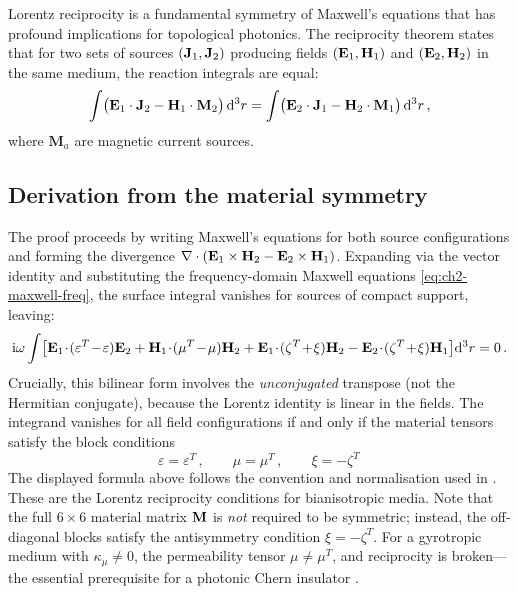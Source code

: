 Lorentz reciprocity is a fundamental symmetry of Maxwell's equations
that has profound implications for topological photonics.  The
reciprocity theorem states that for two sets of sources
$(\mathbf{J}_1,\mathbf{J}_2)$ producing fields
$(\mathbf{E}_1,\mathbf{H}_1)$ and $(\mathbf{E}_2,\mathbf{H}_2)$ in the same
medium, the reaction integrals are equal:
\begin{equation}\label{eq:ch2-lorentz-reciprocity}
  \int\bigl(\mathbf{E}_1\cdot\mathbf{J}_2
  - \mathbf{H}_1\cdot\mathbf{M}_2\bigr)\,\mathrm{d}^3 r
  = \int\bigl(\mathbf{E}_2\cdot\mathbf{J}_1
  - \mathbf{H}_2\cdot\mathbf{M}_1\bigr)\,\mathrm{d}^3 r\,,
\end{equation}
where $\mathbf{M}_a$ are magnetic current sources.

\subsection{Derivation from the material symmetry}
\label{sec:ch2-reciprocity-derivation}

The proof proceeds by writing Maxwell's equations for both source
configurations and forming the divergence
$\nabla\cdot(\mathbf{E}_1\times\mathbf{H}_2-\mathbf{E}_2\times\mathbf{H}_1)$.
Expanding via the vector identity and substituting the frequency-domain
Maxwell equations \eqref{eq:ch2-maxwell-freq}, the surface integral
vanishes for sources of compact support, leaving:
\begin{equation}\label{eq:ch2-reciprocity-condition}
  \ii\omega\int\bigl[
    \Efield_1\!\cdot\!(\varepsilon^T\!-\!\varepsilon)\Efield_2
    + \Hfield_1\!\cdot\!(\mu^T\!-\!\mu)\Hfield_2
    + \Efield_1\!\cdot\!(\zeta^T\!+\!\xi)\Hfield_2
    - \Efield_2\!\cdot\!(\zeta^T\!+\!\xi)\Hfield_1
  \bigr]\dd^3 r = 0\,.
\end{equation}
Crucially, this bilinear form involves the \emph{unconjugated}
transpose (not the Hermitian conjugate), because the Lorentz identity
is linear in the fields.  The integrand vanishes for all field
configurations if and only if the material tensors satisfy the block
conditions
\begin{equation}\label{eq:ch2-block-reciprocity}
  \varepsilon = \varepsilon^T\,,\qquad
  \mu = \mu^T\,,\qquad
  \xi = -\zeta^T\,
\end{equation}
The displayed formula above follows the convention and normalisation used in \cite{wang2007reflection}.
These are the Lorentz reciprocity conditions for bianisotropic media.
Note that the full $6\times 6$ material matrix $\mathbf{M}$ is
\emph{not} required to be symmetric; instead, the off-diagonal blocks
satisfy the antisymmetry condition $\xi=-\zeta^T$.  For a gyrotropic
medium with $\kappa_\mu\neq 0$, the permeability tensor
$\mu\neq\mu^T$, and reciprocity is broken---the essential prerequisite
for a photonic Chern insulator
\cite{ozawa2018topological,gangaraj2016berry}.

